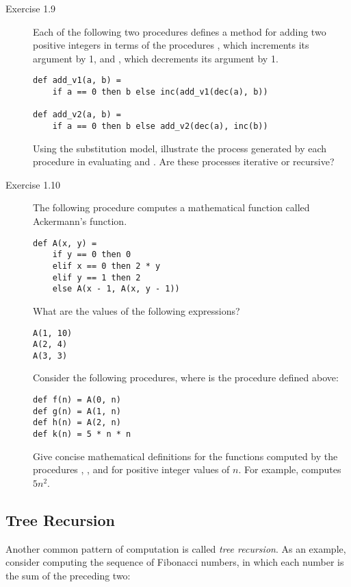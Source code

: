 \begin{description}
\item[Exercise 1.9] Each of the following two procedures defines a method for adding two positive integers in terms of the procedures , which increments its argument by 1, and , which decrements its argument by 1.

\begin{lstlisting}
def add_v1(a, b) =
    if a == 0 then b else inc(add_v1(dec(a), b))

def add_v2(a, b) =
    if a == 0 then b else add_v2(dec(a), inc(b))
\end{lstlisting}

Using the substitution model, illustrate the process generated by each procedure in evaluating  and . Are these processes iterative or recursive?

\item[Exercise 1.10] The following procedure computes a mathematical function called Ackermann's function.

\begin{lstlisting}
def A(x, y) =
    if y == 0 then 0
    elif x == 0 then 2 * y
    elif y == 1 then 2
    else A(x - 1, A(x, y - 1))
\end{lstlisting}

What are the values of the following expressions?

\begin{lstlisting}
A(1, 10)
A(2, 4)
A(3, 3)
\end{lstlisting}

Consider the following procedures, where  is the procedure defined above:

\begin{lstlisting}
def f(n) = A(0, n)
def g(n) = A(1, n)
def h(n) = A(2, n)
def k(n) = 5 * n * n
\end{lstlisting}

Give concise mathematical definitions for the functions computed by the procedures , , and  for positive integer values of $n$. For example,  computes $5n^2$.
\end{description}

\subsection{Tree Recursion}

Another common pattern of computation is called \textit{tree recursion}. As an example, consider computing the sequence of Fibonacci numbers, in which each number is the sum of the preceding two:

